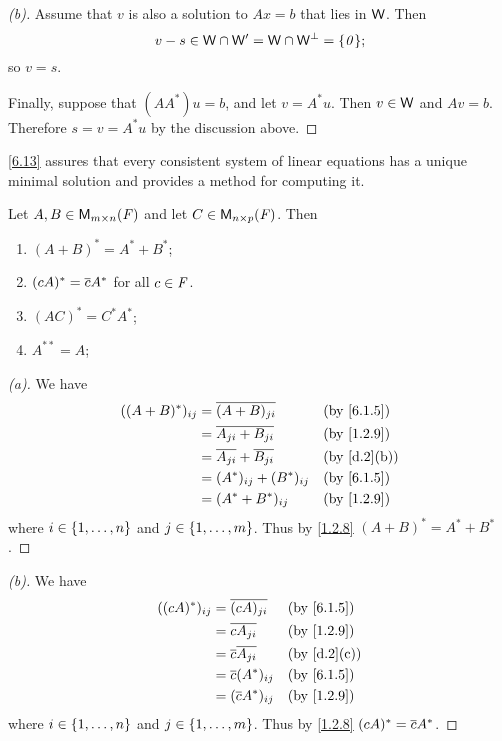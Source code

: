 \begin{proof}[(b)]
	Assume that \(v\) is also a solution to \(Ax = b\) that lies in \(\mathsf{W}\).
	Then
	\[
		v - s \in \W \cap \W' = \W \cap \W^{\perp} = \set{\zv};
	\]
	so \(v = s\).

	Finally, suppose that \((A A^*) u = b\), and let \(v = A^* u\).
	Then \(v \in \mathsf{W}\) and \(Av = b\).
	Therefore \(s = v = A^* u\) by the discussion above.
\end{proof}

\begin{note}
	\cref{6.13} assures that every consistent system of linear equations has a unique minimal solution and provides a method for computing it.
\end{note}

\exercisesection

\setcounter{ex}{4}
\begin{ex}\label{ex:6.3.5}
	Let \(A, B \in \MS\) and let \(C \in \ms[n][p][\F]\).
	Then
	\begin{enumerate}
		\item \((A + B)^* = A^* + B^*\);
		\item \((cA)^* = \overline{c} A^*\) for all \(c \in \mathit{F}\).
		\item \((AC)^* = C^* A^*\);
		\item \(A^{**} = A\);
	\end{enumerate}
\end{ex}

\begin{proof}[(a)]
	We have
	\begin{align*}
		((A + B)^*)_{i j} & = \conj{(A + B)_{j i}}            &  & \by{6.1.5}  \\
		                  & = \conj{A_{j i} + B_{j i}}        &  & \by{1.2.9}  \\
		                  & = \conj{A_{j i}} + \conj{B_{j i}} &  & \by{d.2}[b] \\
		                  & = (A^*)_{i j} + (B^*)_{i j}       &  & \by{6.1.5}  \\
		                  & = (A^* + B^*)_{i j}               &  & \by{1.2.9}
	\end{align*}
	where \(i \in \left\lbrace1, \dots, n\right\rbrace\) and \(j \in \left\lbrace1, \dots, m\right\rbrace\).
	Thus by \cref{1.2.8} \((A + B)^* = A^* + B^*\).
\end{proof}

\begin{proof}[(b)]
	We have
	\begin{align*}
		((cA)^*)_{i j} & = \conj{(cA)_{j i}}       &  & \by{6.1.5}  \\
		               & = \conj{c A_{j i}}        &  & \by{1.2.9}  \\
		               & = \conj{c} \conj{A_{j i}} &  & \by{d.2}[c] \\
		               & = \conj{c} (A^*)_{i j}    &  & \by{6.1.5}  \\
		               & = (\conj{c} A^*)_{i j}    &  & \by{1.2.9}
	\end{align*}
	where \(i \in \left\lbrace1, \dots, n\right\rbrace\) and \(j \in \left\lbrace1, \dots, m\right\rbrace\).
	Thus by \cref{1.2.8} \((cA)^* = \overline{c} A^*\).
\end{proof}

